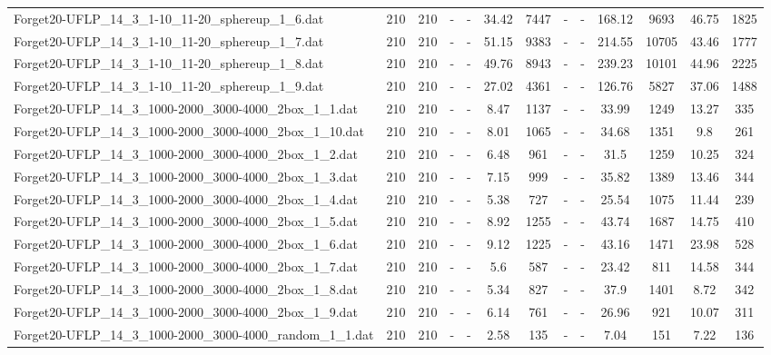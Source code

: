 \begin{table}[!ht]
{\begin{tabular}{lcccccccccccc}
Forget20-UFLP\_14\_3\_1-10\_11-20\_sphereup\_1\_6.dat & 210 & 210 &  - &  - & 34.42 & 7447 &  - &  - & 168.12 & 9693 & 46.75 & 1825 \\
Forget20-UFLP\_14\_3\_1-10\_11-20\_sphereup\_1\_7.dat & 210 & 210 &  - &  - & 51.15 & 9383 &  - &  - & 214.55 & 10705 & 43.46 & 1777 \\
Forget20-UFLP\_14\_3\_1-10\_11-20\_sphereup\_1\_8.dat & 210 & 210 &  - &  - & 49.76 & 8943 &  - &  - & 239.23 & 10101 & 44.96 & 2225 \\
Forget20-UFLP\_14\_3\_1-10\_11-20\_sphereup\_1\_9.dat & 210 & 210 &  - &  - & 27.02 & 4361 &  - &  - & 126.76 & 5827 & 37.06 & 1488 \\
Forget20-UFLP\_14\_3\_1000-2000\_3000-4000\_2box\_1\_1.dat & 210 & 210 &  - &  - & 8.47 & 1137 &  - &  - & 33.99 & 1249 & 13.27 & 335 \\
Forget20-UFLP\_14\_3\_1000-2000\_3000-4000\_2box\_1\_10.dat & 210 & 210 &  - &  - & 8.01 & 1065 &  - &  - & 34.68 & 1351 & 9.8 & 261 \\
Forget20-UFLP\_14\_3\_1000-2000\_3000-4000\_2box\_1\_2.dat & 210 & 210 &  - &  - & 6.48 & 961 &  - &  - & 31.5 & 1259 & 10.25 & 324 \\
Forget20-UFLP\_14\_3\_1000-2000\_3000-4000\_2box\_1\_3.dat & 210 & 210 &  - &  - & 7.15 & 999 &  - &  - & 35.82 & 1389 & 13.46 & 344 \\
Forget20-UFLP\_14\_3\_1000-2000\_3000-4000\_2box\_1\_4.dat & 210 & 210 &  - &  - & 5.38 & 727 &  - &  - & 25.54 & 1075 & 11.44 & 239 \\
Forget20-UFLP\_14\_3\_1000-2000\_3000-4000\_2box\_1\_5.dat & 210 & 210 &  - &  - & 8.92 & 1255 &  - &  - & 43.74 & 1687 & 14.75 & 410 \\
Forget20-UFLP\_14\_3\_1000-2000\_3000-4000\_2box\_1\_6.dat & 210 & 210 &  - &  - & 9.12 & 1225 &  - &  - & 43.16 & 1471 & 23.98 & 528 \\
Forget20-UFLP\_14\_3\_1000-2000\_3000-4000\_2box\_1\_7.dat & 210 & 210 &  - &  - & 5.6 & 587 &  - &  - & 23.42 & 811 & 14.58 & 344 \\
Forget20-UFLP\_14\_3\_1000-2000\_3000-4000\_2box\_1\_8.dat & 210 & 210 &  - &  - & 5.34 & 827 &  - &  - & 37.9 & 1401 & 8.72 & 342 \\
Forget20-UFLP\_14\_3\_1000-2000\_3000-4000\_2box\_1\_9.dat & 210 & 210 &  - &  - & 6.14 & 761 &  - &  - & 26.96 & 921 & 10.07 & 311 \\
Forget20-UFLP\_14\_3\_1000-2000\_3000-4000\_random\_1\_1.dat & 210 & 210 &  - &  - & 2.58 & 135 &  - &  - & 7.04 & 151 & 7.22 & 136 \\

\end{tabular}}
\end{table}

